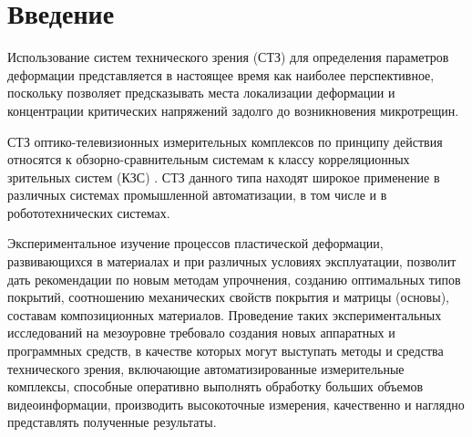 \setcounter{figure}{0}
\newpage
\section*{Введение}



Использование систем технического зрения (СТЗ) для определения параметров деформации представляется в настоящее время как наиболее перспективное, поскольку позволяет предсказывать места локализации деформации и концентрации критических напряжений задолго до возникновения микротрещин.

СТЗ оптико-телевизионных измерительных комплексов по принципу действия относятся к обзорно-сравнительным системам к классу корреляционных зрительных систем (КЗС) \cite{korrel_robot}. СТЗ данного типа находят широкое применение в различных системах промышленной автоматизации, в том числе и в робототехнических системах.


Экспериментальное изучение процессов пластической деформации, развивающихся в материалах и при различных условиях эксплуатации, позволит дать рекомендации по новым методам упрочнения, созданию оптимальных типов покрытий, соотношению механических свойств покрытия и матрицы (основы), составам композиционных материалов. Проведение таких экспериментальных исследований на мезоуровне требовало создания новых аппаратных и программных средств, в качестве которых могут выступать методы и средства технического зрения, включающие автоматизированные измерительные комплексы, способные оперативно выполнять обработку больших объемов видеоинформации, производить высокоточные измерения, качественно и наглядно представлять полученные результаты.

